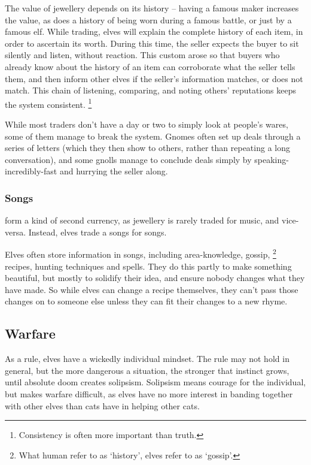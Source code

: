 \begin{multicols}{2}
The value of jewellery depends on its history -- having a famous maker increases the value, as does a history of being worn during a famous battle, or just by a famous elf.
While trading, elves will explain the complete history of each item, in order to ascertain its worth.
During this time, the seller expects the buyer to sit silently and listen, without reaction.
This custom arose so that buyers who already know about the history of an item can corroborate what the seller tells them, and then inform other elves if the seller's information matches, or does not match.
This chain of listening, comparing, and noting others' reputations keeps the system consistent.%
\footnote{Consistency is often more important than truth.}

While most traders don't have a day or two to simply look at people's wares, some of them manage to break the system.
Gnomes often set up deals through a series of letters (which they then show to others, rather than repeating a long conversation), and some gnolls manage to conclude deals simply by {\small speaking-incredibly-fast} and hurrying the seller along.

\subsubsection{Songs}
form a kind of second currency, as jewellery is rarely traded for music, and vice-versa.
Instead, elves trade a songs for songs.

Elves often store information in songs, including area-knowledge, gossip,%
\footnote{What human refer to as `history', elves refer to as `gossip'.}
recipes, hunting techniques and spells.%
They do this partly to make something beautiful, but mostly to solidify their idea, and ensure nobody changes what they have made.
So while elves can change a recipe themselves, they can't pass those changes on to someone else unless they can fit their changes to a new rhyme.

\subsection{Warfare}

As a rule, elves have a wickedly individual mindset. 
The rule may not hold in general, but the more dangerous a situation, the stronger that instinct grows, until absolute doom creates solipsism.
Solipsism means courage for the individual, but makes warfare difficult, as elves have no more interest in banding together with other elves than cats have in helping other cats.


\end{multicols}
